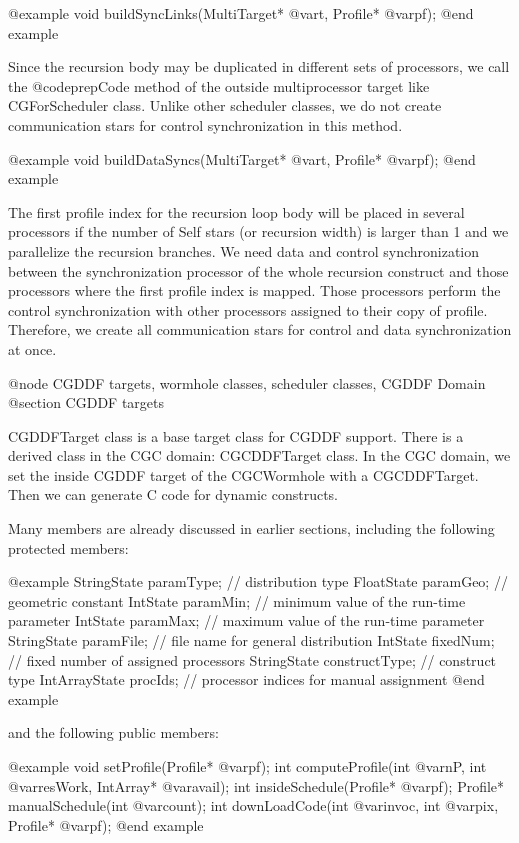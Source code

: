 {@example
void buildSyncLinks(MultiTarget* @var{t}, Profile* @var{pf});
@end example

Since the recursion body may be duplicated in different sets of processors,
we call the @code{prepCode} method of the outside multiprocessor target
like CGForScheduler class. Unlike other scheduler classes, we do not
create communication stars for control synchronization in this method.

@example
void buildDataSyncs(MultiTarget* @var{t}, Profile* @var{pf});
@end example

The first profile index for the recursion loop body will be placed in
several processors if the number of Self stars (or recursion width) is
larger than 1 and we parallelize the recursion branches. We
need data and control synchronization between the synchronization 
processor of the whole recursion construct and those processors 
where the first profile index is mapped. Those processors perform
the control synchronization with other processors assigned to
their copy of profile. Therefore, we create all communication stars
for control and data synchronization at once.

@node CGDDF targets, wormhole classes, scheduler classes, CGDDF Domain
@section CGDDF targets

CGDDFTarget class is a base target class for CGDDF support.
There is a derived class in the CGC domain: CGCDDFTarget class.
In the CGC domain, we set the inside CGDDF target of the CGCWormhole with a
CGCDDFTarget. Then we can generate C code for dynamic constructs.

Many members are already discussed in earlier sections, including the
following protected members:

@example
StringState paramType;		// distribution type
FloatState paramGeo;		// geometric constant
IntState paramMin;		// minimum value of the run-time parameter
IntState paramMax;		// maximum value of the run-time parameter
StringState paramFile;		// file name for general distribution
IntState fixedNum;		// fixed number of assigned processors
StringState constructType;	// construct type
IntArrayState procIds;		// processor indices for manual assignment
@end example

and the following public members:

@example
void setProfile(Profile* @var{pf});
int computeProfile(int @var{nP}, int @var{resWork}, IntArray* @var{avail});
int insideSchedule(Profile* @var{pf});
Profile* manualSchedule(int @var{count});
int downLoadCode(int @var{invoc}, int @var{pix}, Profile* @var{pf});
@end example

}
